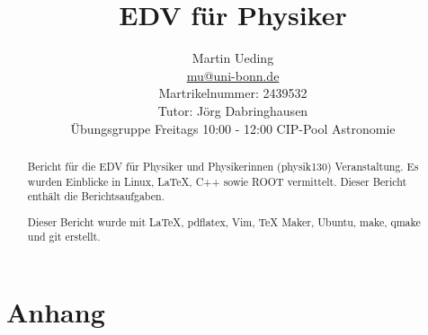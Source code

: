 \documentclass[12pt]{report}
\title{EDV für Physiker}
\author{
Martin Ueding \\
\href{mailto:mu@uni-bonn.de}{mu@uni-bonn.de} \\
Martrikelnummer: 2439532 \\
Tutor: Jörg Dabringhausen \\
Übungsgruppe Freitags 10:00 - 12:00 CIP-Pool Astronomie
}
\newcommand\gqq[1]{\glqq #1\grqq}
\begin{document}
\maketitle

\begin{abstract}
Bericht für die \gqq{EDV für Physiker und Physikerinnen} (physik130) Veranstaltung. Es wurden Einblicke in Linux, \LaTeX, C++ sowie ROOT vermittelt. Dieser Bericht enthält die Berichtsaufgaben.

Dieser Bericht wurde mit \LaTeX, pdflatex, Vim, TeX Maker, Ubuntu, make, qmake und git erstellt.
\end{abstract}

\newpage

\tableofcontents
\newpage








\part{Anhang}

\lstlistoflistings
\end{document}
